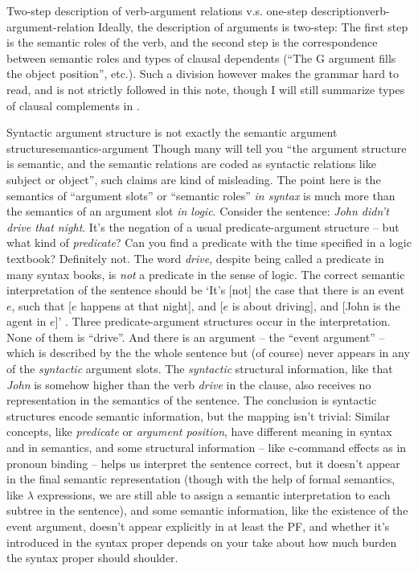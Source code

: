 \documentclass[UTF8, a4paper, oneside, scheme=plain]{ctexrep}
\newcommand*{\term}[1]{\emph{#1}}
\newcommand{\corpus}[1]{\emph{#1}}
\newcommand{\translate}[1]{`#1'}
\begin{document}
\begin{infobox}{Two-step description of verb-argument relations v.s. one-step description}{verb-argument-relation}
    Ideally, the description of arguments is two-step:
    The first step is the semantic roles of the verb,
    and the second step is the correspondence between semantic roles 
    and types of clausal dependents
    (``The G argument fills the object position'', etc.).
    Such a division however makes the grammar hard to read,
    and is not strictly followed in this note,
    though I will still summarize types of clausal complements in .
\end{infobox}

\begin{theorybox}{Syntactic argument structure is not exactly the semantic argument structure}{semantics-argument}
    Though many will tell you ``the argument structure is semantic, 
    and the semantic relations are coded as syntactic relations like subject or object'',
    such claims are kind of misleading.
    The point here is the semantics of ``argument slots'' or ``semantic roles'' \emph{in syntax}
    is much more than the semantics of an argument slot \emph{in logic}.
    Consider the sentence: \corpus{John didn't drive that night}. 
    It's the negation of a usual predicate-argument structure
    -- but what kind of \term{predicate}?
    Can you find a predicate with the time specified in a logic textbook?
    Definitely not. 
    The word \corpus{drive}, despite being called a predicate in many syntax books,
    is \emph{not} a predicate in the sense of logic.
    The correct semantic interpretation of the sentence should be 
    \translate{It's [not] the case that there is an event $e$, such that
    [$e$ happens at that night], and [$e$ is about driving], 
    and [John is the agent in $e$]} \citep{zeijlstra2013}.
    Three predicate-argument structures occur in the interpretation.
    None of them is ``drive''.
    And there is an argument -- the ``event argument'' --
    which is described by the the whole sentence but (of course) 
    never appears in any of the \emph{syntactic} argument slots.
    The \emph{syntactic} structural information,
    like that \corpus{John} is somehow higher than the verb \corpus{drive} in the clause,
    also receives no representation in the semantics of the sentence.
    The conclusion is syntactic structures encode semantic information,
    but the mapping isn't trivial:
    Similar concepts, like \term{predicate} or \term{argument position},
    have different meaning in syntax and in semantics, and 
    some structural information -- like c-command effects as in pronoun binding --
    helps us interpret the sentence correct,
    but it doesn't appear in the final semantic representation 
    (though with the help of formal semantics, like $\lambda$ expressions,
    we are still able to assign a semantic interpretation to each subtree in the sentence),
    and some semantic information, like the existence of the event argument,
    doesn't appear explicitly in at least the PF, 
    and whether it's introduced in the syntax proper depends on 
    your take about how much burden the syntax proper should shoulder.
\end{theorybox}
\end{document}

